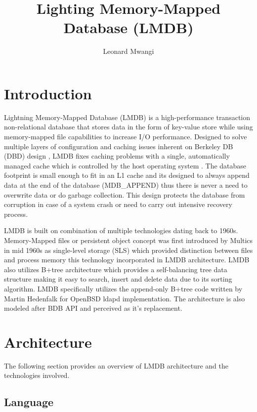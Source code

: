 \documentclass[9pt,twocolumn,twoside]{../../styles/osajnl}
\title{Lighting Memory-Mapped Database (LMDB)}
\author[1]{Leonard Mwangi}
\affil[1]{School of Informatics and Computing, Bloomington, IN 47408, U.S.A.}
\affil[*]{Corresponding authors: lmwangi@iu.edu}
\begin{document}
\maketitle

\section{Introduction}

Lightning Memory-Mapped Database (LMDB) is a high-performance
transaction non-relational database that stores data in the form of
key-value store \cite{www-keyvalue} while using memory-mapped file
capabilities to increase I/O performance. Designed to solve multiple
layers of configuration and caching issues inherent on Berkeley DB
(DBD) design \cite{www-bdb}, LMDB fixes caching problems with a
single, automatically managed cache which is controlled by the host
operating system \cite{www-lmdb}. The database footprint is small
enough to fit in an L1 cache \cite{www-l-cache} and its designed to
always append data at the end of the database (MDB\_APPEND) thus there
is never a need to overwrite data or do garbage collection. This
design protects the database from corruption in case of a system crash
or need to carry out intensive recovery process.

LMDB is built on combination of multiple technologies dating back to
1960s. Memory-Mapped files or persistent object concept was first
introduced by Multics in mid 1960s as single-level storage (SLS)
\cite{www-multics} which provided distinction between files and
process memory this technology incorporated in LMDB architecture. LMDB
also utilizes B+tree architecture which provides a self-balancing tree
data structure making it easy to search, insert and delete data due to
its sorting algorithm. LMDB specifically utilizes the append-only
B+tree code written by Martin Hedenfalk \cite{www-btreecode} for
OpenBSD ldapd implementation. The architecture is also modeled after
BDB API and perceived as it’s replacement.

\section{Architecture}
The following section provides an overview of LMDB architecture and
the technologies involved.

\subsection{Language}
\end{document}
